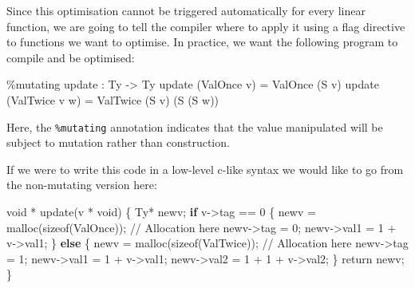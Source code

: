 \documentclass[
]{article}
\newenvironment{Shaded}{}{}
\newcommand{\DataTypeTok}[1]{\textcolor[rgb]{0.56,0.13,0.00}{#1}}
\newcommand{\DecValTok}[1]{\textcolor[rgb]{0.25,0.63,0.44}{#1}}
\newcommand{\FunctionTok}[1]{\textcolor[rgb]{0.02,0.16,0.49}{#1}}
\newcommand{\KeywordTok}[1]{\textcolor[rgb]{0.00,0.44,0.13}{\textbf{#1}}}
\newcommand{\NormalTok}[1]{#1}
\newcommand{\OperatorTok}[1]{\textcolor[rgb]{0.40,0.40,0.40}{#1}}
\newcommand{\OtherTok}[1]{\textcolor[rgb]{0.00,0.44,0.13}{#1}}
\begin{document}
Since this optimisation cannot be triggered automatically for every
linear function, we are going to tell the compiler where to apply it
using a flag directive to functions we want to optimise. In practice, we
want the following program to compile and be optimised:

\begin{Shaded}
\begin{Highlighting}[]
\OperatorTok{\%}\NormalTok{mutating}
\NormalTok{update }\OperatorTok{:} \DataTypeTok{Ty} \OtherTok{{-}\textgreater{}} \DataTypeTok{Ty}
\NormalTok{update (}\DataTypeTok{ValOnce}\NormalTok{ v) }\OtherTok{=} \DataTypeTok{ValOnce}\NormalTok{ (}\DataTypeTok{S}\NormalTok{ v)}
\NormalTok{update (}\DataTypeTok{ValTwice}\NormalTok{ v w) }\OtherTok{=} \DataTypeTok{ValTwice}\NormalTok{ (}\DataTypeTok{S}\NormalTok{ v) (}\DataTypeTok{S}\NormalTok{ (}\DataTypeTok{S}\NormalTok{ w))}
\end{Highlighting}
\end{Shaded}

Here, the \texttt{\%mutating} annotation indicates that the value
manipulated will be subject to mutation rather than construction.

If we were to write this code in a low-level c-like syntax we would like
to go from the non-mutating version here:

\begin{Shaded}
\begin{Highlighting}[]
\NormalTok{void }\OperatorTok{*}\NormalTok{ update(v }\OperatorTok{*}\NormalTok{ void) \{}
    \DataTypeTok{Ty}\OperatorTok{*}\NormalTok{ newv;}
    \KeywordTok{if}\NormalTok{ v}\OtherTok{{-}\textgreater{}}\NormalTok{tag }\OperatorTok{==} \DecValTok{0}\NormalTok{ \{}
\NormalTok{        newv }\OtherTok{=}\NormalTok{ malloc(sizeof(}\DataTypeTok{ValOnce}\NormalTok{)); }\OperatorTok{//} \DataTypeTok{Allocation}\NormalTok{ here}
\NormalTok{        newv}\OtherTok{{-}\textgreater{}}\NormalTok{tag }\OtherTok{=} \DecValTok{0}\NormalTok{;}
\NormalTok{        newv}\OtherTok{{-}\textgreater{}}\NormalTok{val1 }\OtherTok{=} \DecValTok{1} \OperatorTok{+}\NormalTok{ v}\OtherTok{{-}\textgreater{}}\NormalTok{val1;}
\NormalTok{    \} }\KeywordTok{else}\NormalTok{ \{}
\NormalTok{        newv }\OtherTok{=}\NormalTok{ malloc(sizeof(}\DataTypeTok{ValTwice}\NormalTok{)); }\OperatorTok{//} \DataTypeTok{Allocation}\NormalTok{ here}
\NormalTok{        newv}\OtherTok{{-}\textgreater{}}\NormalTok{tag }\OtherTok{=} \DecValTok{1}\NormalTok{;}
\NormalTok{        newv}\OtherTok{{-}\textgreater{}}\NormalTok{val1 }\OtherTok{=} \DecValTok{1} \OperatorTok{+}\NormalTok{ v}\OtherTok{{-}\textgreater{}}\NormalTok{val1;}
\NormalTok{        newv}\OtherTok{{-}\textgreater{}}\NormalTok{val2 }\OtherTok{=} \DecValTok{1} \OperatorTok{+} \DecValTok{1} \OperatorTok{+}\NormalTok{ v}\OtherTok{{-}\textgreater{}}\NormalTok{val2;}
\NormalTok{    \}}
    \FunctionTok{return}\NormalTok{ newv;}
\NormalTok{\}}
\end{Highlighting}
\end{Shaded}
\end{document}

